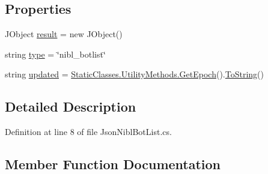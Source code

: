 \subsection*{Properties}
\begin{DoxyCompactItemize}
\item 
J\+Object \mbox{\hyperlink{class_little_weeb_library_1_1_models_1_1_json_nibl_bot_list_adbd5920212e2cb6bbf3f43fff328af92}{result}} = new J\+Object()
\item 
string \mbox{\hyperlink{class_little_weeb_library_1_1_models_1_1_json_nibl_bot_list_af742b935697bf89647242479744af6e5}{type}} = \char`\"{}nibl\+\_\+botlist\char`\"{}
\item 
string \mbox{\hyperlink{class_little_weeb_library_1_1_models_1_1_json_nibl_bot_list_a847e10383522c3a7e8de785080690b07}{updated}} = \mbox{\hyperlink{class_little_weeb_library_1_1_static_classes_1_1_utility_methods_a12336d9e64983ddabaad8950486fafb2}{Static\+Classes.\+Utility\+Methods.\+Get\+Epoch}}().\mbox{\hyperlink{class_little_weeb_library_1_1_models_1_1_json_nibl_bot_list_aff76def0d8bf7b2d2f3b985a0507d6a0}{To\+String}}()
\end{DoxyCompactItemize}


\subsection{Detailed Description}


Definition at line 8 of file Json\+Nibl\+Bot\+List.\+cs.



\subsection{Member Function Documentation}
\mbox{\label{class_little_weeb_library_1_1_models_1_1_json_nibl_bot_list_a852d40e99ff93888a16fdba1d45aee14}} 

